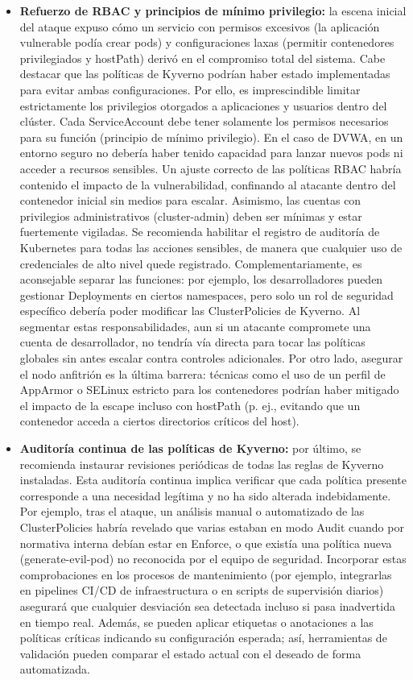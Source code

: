 \documentclass[12pt,twoside,titlepage]{report}
\begin{document}
\begin{itemize}
    \item \textbf{Refuerzo de RBAC y principios de mínimo privilegio:} la escena inicial del ataque expuso cómo un servicio con permisos excesivos (la aplicación vulnerable podía crear pods) y configuraciones laxas (permitir contenedores privilegiados y hostPath) derivó en el compromiso total del sistema. Cabe destacar que las políticas de Kyverno podrían haber estado implementadas para evitar ambas configuraciones. Por ello, es imprescindible limitar estrictamente los privilegios otorgados a aplicaciones y usuarios dentro del clúster. Cada ServiceAccount debe tener solamente los permisos necesarios para su función (principio de mínimo privilegio). En el caso de DVWA, en un entorno seguro no debería haber tenido capacidad para lanzar nuevos pods ni acceder a recursos sensibles. Un ajuste correcto de las políticas RBAC habría contenido el impacto de la vulnerabilidad, confinando al atacante dentro del contenedor inicial sin medios para escalar. Asimismo, las cuentas con privilegios administrativos (cluster-admin) deben ser mínimas y estar fuertemente vigiladas. Se recomienda habilitar el registro de auditoría de Kubernetes para todas las acciones sensibles, de manera que cualquier uso de credenciales de alto nivel quede registrado. Complementariamente, es aconsejable separar las funciones: por ejemplo, los desarrolladores pueden gestionar Deployments en ciertos namespaces, pero solo un rol de seguridad específico debería poder modificar las ClusterPolicies de Kyverno. Al segmentar estas responsabilidades, aun si un atacante compromete una cuenta de desarrollador, no tendría vía directa para tocar las políticas globales sin antes escalar contra controles adicionales. Por otro lado, asegurar el nodo anfitrión es la última barrera: técnicas como el uso de un perfil de AppArmor o SELinux estricto para los contenedores podrían haber mitigado el impacto de la escape incluso con hostPath (p. ej., evitando que un contenedor acceda a ciertos directorios críticos del host).
    \item \textbf{Auditoría continua de las políticas de Kyverno:} por último, se recomienda instaurar revisiones periódicas de todas las reglas de Kyverno instaladas. Esta auditoría continua implica verificar que cada política presente corresponde a una necesidad legítima y no ha sido alterada indebidamente. Por ejemplo, tras el ataque, un análisis manual o automatizado de las ClusterPolicies habría revelado que varias estaban en modo Audit cuando por normativa interna debían estar en Enforce, o que existía una política nueva (generate-evil-pod) no reconocida por el equipo de seguridad. Incorporar estas comprobaciones en los procesos de mantenimiento (por ejemplo, integrarlas en pipelines CI/CD de infraestructura o en scripts de supervisión diarios) asegurará que cualquier desviación sea detectada incluso si pasa inadvertida en tiempo real. Además, se pueden aplicar etiquetas o anotaciones a las políticas críticas indicando su configuración esperada; así, herramientas de validación pueden comparar el estado actual con el deseado de forma automatizada. 
\end{itemize}
\end{document}
